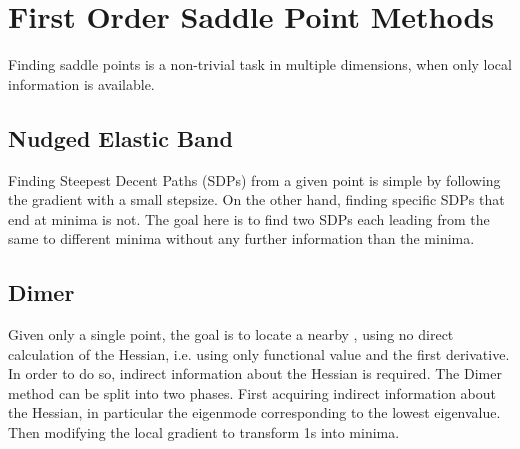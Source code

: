 \section{First Order Saddle Point Methods}
\label{sec:sps}

Finding saddle points is a non-trivial task in multiple dimensions, when only local information is available.

\placeholder

\subsection{Nudged Elastic Band}
\label{sec:neb}

Finding Steepest Decent Paths (SDPs) from a given point is simple by following the gradient with a small stepsize.
On the other hand, finding specific SDPs that end at minima is not.
The goal here is to find two SDPs each leading from the same  to different minima without any further information than the minima.


\placeholder

\subsection{Dimer}
\label{sec:dimer}

Given only a single point, the goal is to locate a nearby , using no direct calculation of the Hessian, i.e. using only functional value and the first derivative.
In order to do so, indirect information about the Hessian is required.
The Dimer method can be split into two phases.
First acquiring indirect information about the Hessian, in particular the eigenmode corresponding to the lowest eigenvalue.
Then modifying the local gradient to transform \sap1s into minima.

\placeholder
